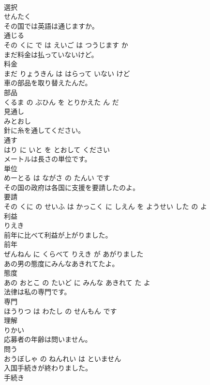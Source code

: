 \documentclass[8pt]{extreport}
\begin{document}
\begin{CJK}{UTF8}{min}
\\	選択	
\\	せんたく		
\\	その国では英語は通じますか。	
\\	通じる 
\\	その くに で は えいご は つうじます か			
\\	まだ料金は払っていないけど。	
\\	料金 
\\	まだ りょうきん は はらって いない けど			
\\	車の部品を取り替えたんだ。	
\\	部品 
\\	くるま の ぶひん を とりかえた ん だ			
\\	見通し	
\\	みとおし		
\\	針に糸を通してください。	
\\	通す 
\\	はり に いと を とおして ください			
\\	メートルは長さの単位です。	
\\	単位 
\\	めーとる は ながさ の たんい です			
\\	その国の政府は各国に支援を要請したのよ。	
\\	要請 
\\	その くに の せいふ は かっこく に しえん を ようせい した の よ			
\\	利益	
\\	りえき		
\\	前年に比べて利益が上がりました。	
\\	前年 
\\	ぜんねん に くらべて りえき が あがりました			
\\	あの男の態度にみんなあきれてたよ。	
\\	態度 
\\	あの おとこ の たいど に みんな あきれて た よ			
\\	法律は私の専門です。	
\\	専門 
\\	ほうりつ は わたし の せんもん です			
\\	理解	
\\	りかい		
\\	応募者の年齢は問いません。	
\\	問う 
\\	おうぼしゃ の ねんれい は といません			
\\	入国手続きが終わりました。	
\\	手続き 

\end{CJK}
\end{document}
